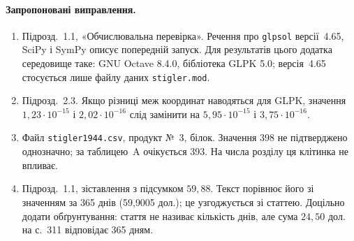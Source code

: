 \paragraph{Запропоновані виправлення.}
\begin{enumerate}
\item Підрозд.~1.1, «Обчислювальна перевірка». Речення про \texttt{glpsol} версії~4.65, SciPy і SymPy описує попередній запуск. Для результатів цього додатка середовище таке: GNU Octave 8.4.0, бібліотека GLPK 5.0; версія~4.65 стосується лише файлу даних \texttt{stigler.mod}.
\item Підрозд.~2.3. Якщо різниці меж координат наводяться для GLPK, значення $1{,}23\cdot10^{-15}$ і $2{,}02\cdot10^{-16}$ слід замінити на $5{,}95\cdot10^{-15}$ і $3{,}75\cdot10^{-16}$.
\item Файл \texttt{stigler1944.csv}, продукт №~3, білок. Значення 398 не підтверджено однозначно; за таблицею~A очікується 393. На числа розділу ця клітинка не впливає.
\item Підрозд.~1.1, зіставлення з підсумком $59{,}88$. Текст порівнює його зі значенням за 365 днів (59{,}9005 дол.); це узгоджується зі статтею. Доцільно додати обґрунтування: стаття не називає кількість днів, але сума $24{,}50$ дол. на с.~311 відповідає 365 дням.
\end{enumerate}
